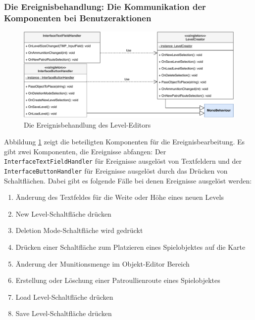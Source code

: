 \subsubsection{Die Ereignisbehandlung: Die Kommunikation der Komponenten bei Benutzeraktionen} \label{chapter:eventmanagement}
\begin {figure}[h]
	\begin {center}
	    \includegraphics[width=1\textwidth]{pics/leveleditor_eventhandler.pdf}
		\caption{Die Ereignisbehandlung des Level-Editors}
		\label{fig:eventhandler}
	\end {center}
\end {figure}

Abbildung \ref{fig:eventhandler} zeigt die beteiligten Komponenten für die Ereignisbearbeitung. Es gibt zwei Komponenten, die Ereignisse abfangen: Der \texttt{InterfaceTextFieldHandler} für Ereignisse ausgelöst von Textfeldern und der \texttt{InterfaceButtonHandler} für Ereignisse ausgelöst durch das Drücken von Schaltflächen. Dabei gibt es folgende Fälle bei denen Ereignisse ausgelöst werden:

\begin{enumerate}
	\item Änderung des Textfeldes für die Weite oder Höhe eines neuen Levels
	\item \glqq{}New Level\grqq{}-Schaltfläche drücken
	\item \glqq{}Deletion Mode\grqq{}-Schaltfläche wird gedrückt
	\item Drücken einer Schaltfläche zum Platzieren eines Spielobjektes auf die Karte
	\item Änderung der Munitionsmenge im Objekt-Editor Bereich
	\item Erstellung oder Löschung einer Patroullienroute eines Spielobjektes
	\item \glqq{}Load Level\grqq{}-Schaltfläche drücken
	\item \glqq{}Save Level\grqq{}-Schaltfläche drücken
\end{enumerate}

